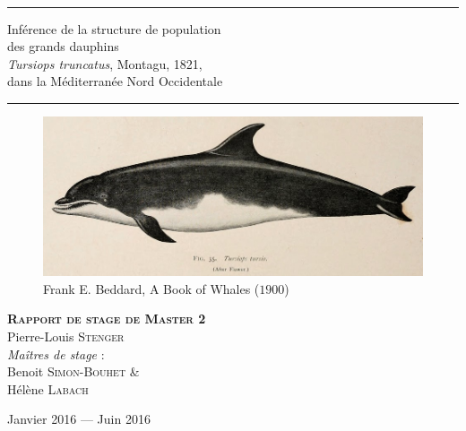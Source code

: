 \documentclass[a4paper,12pt,twoside]{article}\usepackage[]{graphicx}\usepackage[]{color}
\begin{document}
\begin{titlepage}
\begin{sffamily}
\begin{center}
   \\[2cm]
   
      \rule[0.5ex]{\textwidth}{0.1mm}

    { \huge Inférence de la structure de population \\des grands dauphins \\
	\emph{Tursiops truncatus}, Montagu, 1821, \\
	dans la Méditerranée Nord Occidentale\\[0.4cm] }
	
   \rule[0.5ex]{\textwidth}{0.1mm}
   
   \begin{figure}[htbp]
   	\centering
   		\includegraphics[width=\textwidth]{tursiops}
   	\small{Frank E. Beddard, A Book of Whales ($1900$)}
   \end{figure}
   
    \textbf{\textsc{ Rapport de stage de Master 2}}\\[1cm]
	
\textrm{\Large{Pierre-Louis}} \textsc{\Large{Stenger}}\\[1cm]

        \emph{Maîtres de stage} : \\
		
		\textrm{\large{Benoit}} \textsc{\large{Simon-Bouhet}}
		\& \\
		\textrm{\large{Hélène}} \textsc{\large{Labach}}

    \vfill
    {\large Janvier 2016 — Juin 2016}

  \end{center}
  \end{sffamily}
\end{titlepage}

\newpage
\null
\thispagestyle{empty}
\setcounter{page}{0}
\newpage

 \setcounter{page}{1} 
\frontmatter
\end{document}
